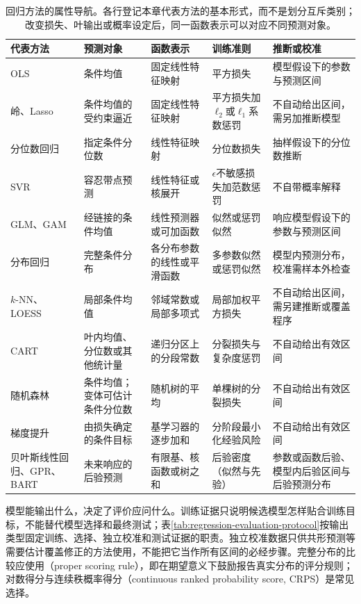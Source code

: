 \begin{table}[htbp]
  \centering
  \small
  \begin{tabularx}{\linewidth}{@{}>{\RaggedRight\arraybackslash}p{25mm}XXXX@{}}
    \toprule
    代表方法 & 预测对象 & 函数表示 & 训练准则 & 推断或校准 \\
    \midrule
    OLS & 条件均值 & 固定线性特征映射 & 平方损失 & 模型假设下的参数与预测区间 \\
    岭、Lasso & 条件均值的受约束逼近 & 固定线性特征映射 & 平方损失加$\ell_2$或$\ell_1$系数惩罚 & 不自动给出区间，需另加推断模型 \\
    分位数回归 & 指定条件分位数 & 线性特征映射 & 分位数损失 & 抽样假设下的分位数推断 \\
    SVR & 容忍带点预测 & 线性特征或核展开 & $\epsilon$不敏感损失加范数惩罚 & 不自带概率解释 \\
    GLM、GAM & 经链接的条件均值 & 线性预测器或可加函数 & 似然或惩罚似然 & 响应模型假设下的参数与预测区间 \\
    分布回归 & 完整条件分布 & 各分布参数的线性或平滑函数 & 多参数似然或惩罚似然 & 模型内预测分布，校准需样本外检查 \\
    $k$-NN、LOESS & 局部条件均值 & 邻域常数或局部多项式 & 局部加权平方损失 & 不自动给出区间，需另建推断或覆盖程序 \\
    CART & 叶内均值、分位数或其他统计量 & 递归分区上的分段常数 & 分裂损失与复杂度惩罚 & 不自动给出有效区间 \\
    随机森林 & 条件均值；变体可估计条件分位数 & 随机树的平均 & 单棵树的分裂损失 & 不自动给出有效区间 \\
    梯度提升 & 由损失确定的条件目标 & 基学习器的逐步加和 & 分阶段最小化经验风险 & 不自动给出有效区间 \\
    贝叶斯线性回归、GPR、BART & 未来响应的后验预测 & 有限基、核函数或树之和 & 后验密度（似然与先验） & 参数或函数后验、模型内后验区间与后验预测分布 \\
    \bottomrule
  \end{tabularx}
  \caption{回归方法的属性导航。各行登记本章代表方法的基本形式，而不是划分互斥类别；改变损失、叶输出或概率设定后，同一函数表示可以对应不同预测对象。}
  \label{tab:regression-navigation}
\end{table}

模型能输出什么，决定了评价应问什么。训练证据只说明候选模型怎样贴合训练目标，不能替代模型选择和最终测试；表\ref{tab:regression-evaluation-protocol}按输出类型固定训练、选择、独立校准和测试证据的职责。独立校准数据只供共形预测等需要估计覆盖修正的方法使用，不能把它当作所有区间的必经步骤。完整分布的比较应使用（proper scoring rule），即在期望意义下鼓励报告真实分布的评分规则；对数得分与连续秩概率得分（continuous ranked probability score, CRPS）是常见选择。

